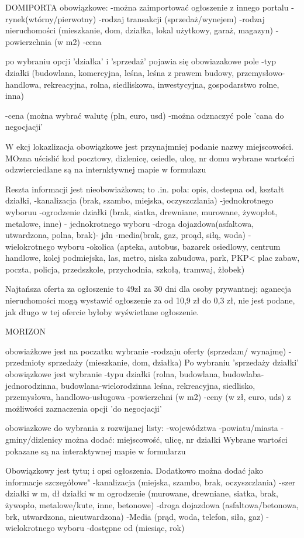 \documentclass[a4paper,12pt,twoside,openany]{report}
\begin{document}
DOMIPORTA
obowiązkowe:
-można zaimportować ogłoszenie z innego portalu
-rynek(wtórny/pierwotny)
-rodzaj transakcji (sprzedaż/wynejem)
-rodzaj nieruchomości (mieszkanie, dom, działka, lokal użytkowy, garaż, magazyn)
-powierzchnia (w m2)
-cena

po wybraniu opcji 'działka' i 'sprzedaż' pojawia się obowiazakowe pole 
-typ działki (budowlana, komercyjna, leśna, leśna z prawem budowy, przemysłowo-handlowa, rekreacyjna, rolna, siedliskowa, inwestycyjna, gospodarstwo rolne, inna)

-cena (można wybrać walutę (pln, euro, usd)
-można odznaczyć pole 'cana do negocjacji'

W ekcj lokazlizacja obowiązkowe jest przynajmniej podanie nazwy miejscowości.
MOzna uścislić kod pocztowy, dizlenicę, osiedle, ulcę, nr domu
wybrane wartości odzwierciedlane są na internktywnej mapie w formulazu

Reszta informacji jest nieobowiażkowa; to .in. pola:
opis, dostepna od, kształt działki,
-kanalizacja (brak, szambo, miejska, oczyszczlania) -jednokrotnego wyboruu
-ogrodzenie działki (brak, siatka, drewniane, murowane, żywopłot, metalowe, inne) - jednokrotnego wyboru
-droga dojazdowa(asfaltowa, utwardzona, polna, brak)- jdn
-media(brak, gaz, proąd, siłą, woda) - wielokrotnego wyboru
-okolica (apteka, autobus, bazarek osiedlowy, centrum handlowe, kolej podmiejska, las, metro, niska zabudowa, park, PKP< plac zabaw, poczta, policja, przedszkole, przychodnia, szkołą, tramwaj, żłobek)

Najtańsza oferta za ogłoszenie to 49zł za 30 dni dla osoby prywantnej; aganecja nieruchomości mogą wystawić ogłoszenie za od 10,9 zł do 0,3 zł, nie jest podane, jak długo w tej ofercie byłoby wyświetlane ogłoszenie.


MORIZON

obowiażkowe jest na poczatku wybranie
-rodzaju oferty (sprzedam/ wynajmę)
- przedmioty sprzedaży (mieszkanie, dom, działka)
Po wybraniu 'sprzedaży działki' obowiązkowe jest wybranie
-typu działki (rolna, budowlana, budowlaba-jednorodzinna, budowlana-wielorodzinna leśna, rekreacyjna, siedlisko, przemysłowa, handlowo-usługowa
-powierzchni (w m2)
-ceny (w zł, euro, uds) z możliwości zaznaczenia opcji 'do negocjacji'

obowiazkowe do wybrania z rozwijanej listy:
-województwa
-powiatu/miasta
-gminy/dizlenicy
można dodać:
miejscowość, ulicę, nr działki
Wybrane wartości pokazane są na interaktywnej mapie w formularzu

Obowiązkowy jest tytu; i opsi ogłoszenia.
Dodatkowo można dodać jako informacje szczegółowe"
-kanalizacja (miejska, szambo, brak, oczyszczlania)
-szer działki w m, dł działki w m
ogrodzenie (murowane, drewniane, siatka, brak, żywopło, metalowe/kute, inne, betonowe)
-droga dojazdowa (asfaltowa/betonowa, brk, utwardzona, nieutwardzona)
-Media (prąd, woda, telefon, siła, gaz) - wielokrotnego wyboru
-dostępne od (miesiąc, rok)
\end{document}
